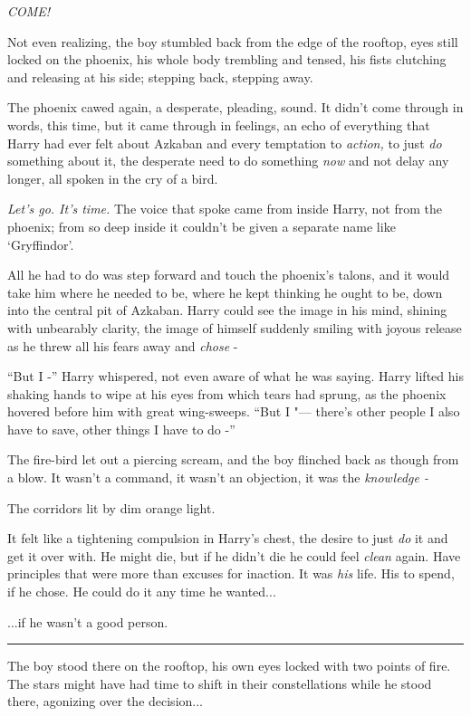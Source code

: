 \emph{COME!}

Not even realizing, the boy stumbled back from the edge of the rooftop,
eyes still locked on the phoenix, his whole body trembling and tensed,
his fists clutching and releasing at his side; stepping back, stepping
away.

The phoenix cawed again, a desperate, pleading, sound. It didn't come
through in words, this time, but it came through in feelings, an echo of
everything that Harry had ever felt about Azkaban and every temptation
to \emph{action,} to just \emph{do} something about it, the desperate
need to do something \emph{now} and not delay any longer, all spoken in
the cry of a bird.

\emph{Let's go. It's time.} The voice that spoke came from inside Harry,
not from the phoenix; from so deep inside it couldn't be given a
separate name like `Gryffindor'.

All he had to do was step forward and touch the phoenix's talons, and it
would take him where he needed to be, where he kept thinking he ought to
be, down into the central pit of Azkaban. Harry could see the image in
his mind, shining with unbearably clarity, the image of himself suddenly
smiling with joyous release as he threw all his fears away and
\emph{chose} -

``But I -'' Harry whispered, not even aware of what he was saying. Harry
lifted his shaking hands to wipe at his eyes from which tears had
sprung, as the phoenix hovered before him with great wing-sweeps. ``But
I "--- there's other people I also have to save, other things I have to do
-''

The fire-bird let out a piercing scream, and the boy flinched back as
though from a blow. It wasn't a command, it wasn't an objection, it was
the \emph{knowledge -}

The corridors lit by dim orange light.

It felt like a tightening compulsion in Harry's chest, the desire to
just \emph{do} it and get it over with. He might die, but if he didn't
die he could feel \emph{clean} again. Have principles that were more
than excuses for inaction. It was \emph{his} life. His to spend, if he
chose. He could do it any time he wanted...

...if he wasn't a good person.

\begin{center}\rule{3in}{0.4pt}\end{center}

The boy stood there on the rooftop, his own eyes locked with two points
of fire. The stars might have had time to shift in their constellations
while he stood there, agonizing over the decision...

